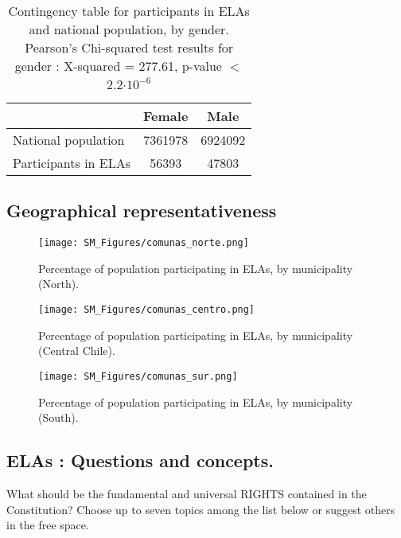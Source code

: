 \documentclass[onecolumn]{article}
\begin{document}
\begin{table}[h!]
\caption{Contingency table for participants in ELAs and national population, by gender. Pearson's Chi-squared test results for gender : X-squared = 277.61,  p-value $<$ 2.2$\cdot 10^{-6}$ }
\label{tab:sex_chi}
\centering
\begin{tabular}{|l|c|c|}
\hline 
 & Female & Male \\ 
\hline 
National population & 7361978 & 6924092 \\ 
Participants in ELAs & 56393 & 47803 \\ 
\hline 
\end{tabular}
\end{table}

\pagebreak
\clearpage

\subsection{Geographical representativeness}

\begin{figure}[!h]
\centering
\texttt{[image: SM\_Figures/comunas\_norte.png]}
\caption{Percentage of population participating in ELAs, by municipality (North).}
\label{fig:norte}
\end{figure}

\begin{figure}[!h]
\centering
\texttt{[image: SM\_Figures/comunas\_centro.png]}
\caption{Percentage of population participating in ELAs, by municipality (Central Chile).}
\label{fig:centro}
\end{figure}

\begin{figure}[!h]
\centering
\texttt{[image: SM\_Figures/comunas\_sur.png]}
\caption{Percentage of population participating in ELAs, by municipality (South).}
\label{fig:sur}
\end{figure}

\pagebreak
\clearpage


\subsection{ELAs : Questions and concepts.}\label{sec:elasqq}
What should be the fundamental and universal RIGHTS contained in the Constitution? Choose up to seven topics among the list below or suggest others in the free space. 
\end{document}
